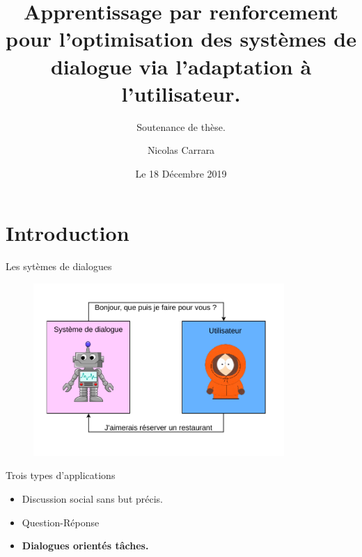 \documentclass[french,handout]{beamer}
\title[TITLE]{Apprentissage par renforcement pour l'optimisation des systèmes de dialogue via l'adaptation à l'utilisateur.}
\subtitle{Soutenance de thèse.}
\author{Nicolas Carrara}
\institute[ULille]{Université de Lille}
\date{Le 18 Décembre 2019}
\begin{document}
    \begin{frame}
        \maketitle
        \centering
    \end{frame}

    \section{Introduction}

    \begin{frame}{Les sytèmes de dialogues}

        \begin{figure}
            \begin{center}
                \includegraphics[width=0.85\textwidth]{drawio/out/sds.pdf}
            \end{center}
        \end{figure}

    \end{frame}

    \begin{frame}{Trois types d'applications}

        \begin{itemize}
            \item Discussion social sans but précis.
            \item Question-Réponse
            \item \textbf{Dialogues orientés tâches.}
        \end{itemize}


    \end{frame}
\end{document}
